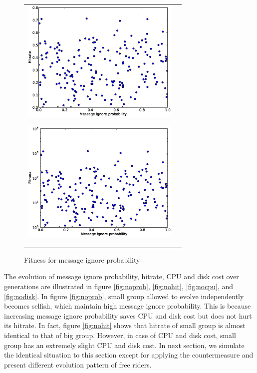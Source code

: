 \documentclass[12pt,journal,draftcls,letterpaper,onecolumn]{IEEEtran}
\begin{document}
\begin{center}
\begin{figure}[ht]
\centering
\begin{tabular}{c c}
\begin{minipage}[t]{3in}
\centering
\includegraphics[width=3in]{hitrate1}
\caption{Hitrate for message ignore probability}
\label{fig:nohitrate}
\end{minipage}
\begin{minipage}[t]{3in}
\centering
\includegraphics[width=3in]{fitness1}
\label{fig:fitness1}
\caption{Fitness for message ignore probability}
\end{minipage}
\end{tabular}
\end{figure}
\end{center}

The evolution of message ignore probability, hitrate, CPU and disk cost over generations are
illustrated in figure \ref{fig:noprob}, \ref{fig:nohit}, \ref{fig:nocpu}, and \ref{fig:nodisk}. 
In figure \ref{fig:noprob}, small group allowed to evolve independently becomes selfish, 
which maintain high message ignore probability. This is because increasing
message ignore probability saves CPU and disk cost but does not hurt its hitrate. In fact,
figure \ref{fig:nohit} shows that hitrate of small group is almost identical to that of big group. However,
in case of CPU and disk cost, small group has an extremely slight CPU and disk cost. In next
section, we simulate the identical situation to this section except for applying the
countermeasure and present different evolution pattern of free riders.
\end{document}
